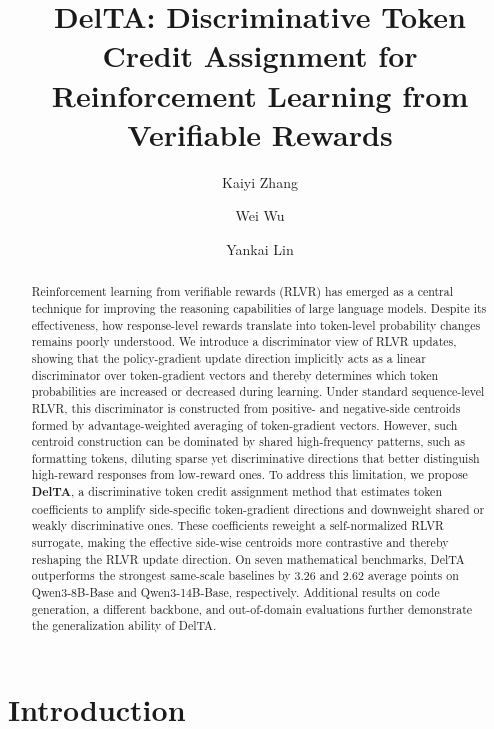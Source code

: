 \documentclass{llmxive}
\title{DelTA: Discriminative Token Credit Assignment for Reinforcement Learning from Verifiable Rewards}
\author{Kaiyi Zhang \and Wei Wu \and Yankai Lin}
\providecommand{\thefootnote}{\fnsymbol{footnote}}
\providecommand{\Eq}[1]{Eq.~(\ref{#1})}
\begin{document}
\maketitle
\begin{abstract}
Reinforcement learning from verifiable rewards (RLVR) has emerged as a central technique for improving the reasoning capabilities of large language models. 
Despite its effectiveness, how response-level rewards translate into token-level probability changes remains poorly understood. 
We introduce a discriminator view of RLVR updates, showing that the policy-gradient update direction implicitly acts as a linear discriminator over token-gradient vectors and thereby determines which token probabilities are increased or decreased during learning. 
Under standard sequence-level RLVR, this discriminator is constructed from positive- and negative-side centroids formed by advantage-weighted averaging of token-gradient vectors. 
However, such centroid construction can be dominated by shared high-frequency patterns, such as formatting tokens, diluting sparse yet discriminative directions that better distinguish high-reward responses from low-reward ones.
To address this limitation, we propose \textbf{DelTA}, a discriminative token credit assignment method that estimates token coefficients to amplify side-specific token-gradient directions and downweight shared or weakly discriminative ones. These coefficients reweight a self-normalized RLVR surrogate, making the effective side-wise centroids more contrastive and thereby reshaping the RLVR update direction. 
On seven mathematical benchmarks, DelTA outperforms the strongest same-scale baselines by 3.26 and 2.62 average points on Qwen3-8B-Base and Qwen3-14B-Base, respectively. 
Additional results on code generation, a different backbone, and out-of-domain evaluations further demonstrate the generalization ability of DelTA.
\end{abstract}
\renewcommand{\thefootnote}{\fnsymbol{footnote}}

\renewcommand{\thefootnote}{\arabic{footnote}}
\setcounter{footnote}{0}
\renewcommand{\Eq}[1]{Eq.~(\ref{#1})}




\section{Introduction}
\end{document}
